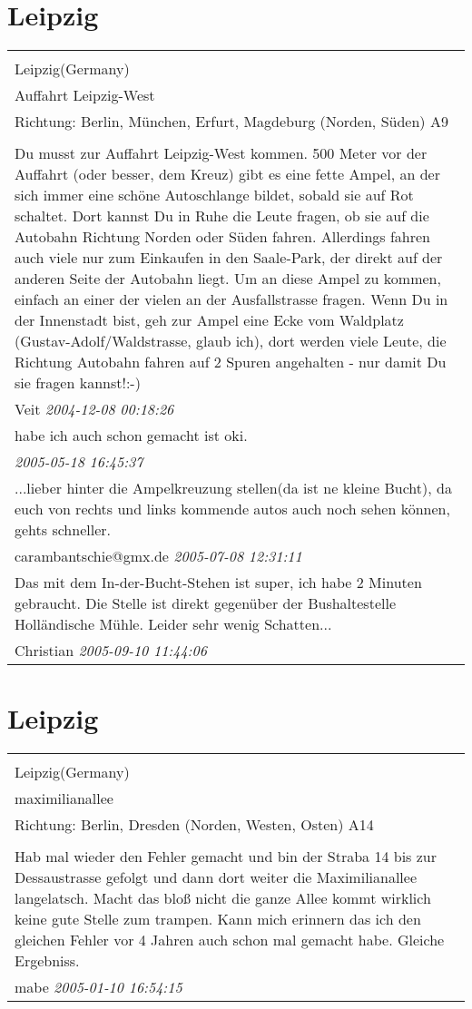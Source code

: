 \documentclass[a4paper,12pt]{article}
\begin{document}
\section{Leipzig}
\begin{tabular}{|p{13cm}|}
\hline\\
Leipzig(Germany)\\
Auffahrt Leipzig-West\\
Richtung: Berlin, München, Erfurt, Magdeburg (Norden, Süden) A9 \\
\hline\\
Du musst zur Auffahrt Leipzig-West kommen. 500 Meter vor der Auffahrt (oder besser, dem Kreuz) gibt es eine fette Ampel, an der sich immer eine schöne Autoschlange bildet, sobald sie auf Rot schaltet. Dort kannst Du in Ruhe die Leute fragen, ob sie auf die Autobahn Richtung Norden oder Süden fahren. Allerdings fahren auch viele nur zum Einkaufen in den Saale-Park, der direkt auf der anderen Seite der Autobahn liegt. Um an diese Ampel zu kommen, einfach an einer der vielen an der Ausfallstrasse fragen. Wenn Du in der Innenstadt bist, geh zur Ampel eine Ecke vom Waldplatz (Gustav-Adolf/Waldstrasse, glaub ich), dort werden viele Leute, die Richtung Autobahn fahren auf 2 Spuren angehalten - nur damit Du sie fragen kannst!:-) \\
Veit \textit{ 2004-12-08 00:18:26 }\\\hline habe ich auch schon gemacht ist oki. \\
\textit{ 2005-05-18 16:45:37 }\\\hline ...lieber hinter die Ampelkreuzung stellen(da ist ne kleine Bucht), da euch von rechts und links kommende autos auch noch sehen können, gehts schneller. \\
carambantschie@gmx.de \textit{ 2005-07-08 12:31:11 }\\\hline Das mit dem In-der-Bucht-Stehen ist super, ich habe 2 Minuten gebraucht. Die Stelle ist direkt gegenüber der Bushaltestelle Holländische Mühle. Leider sehr wenig Schatten... \\
Christian \textit{ 2005-09-10 11:44:06 }\\\hline
\end{tabular}


\section{Leipzig}
\begin{tabular}{|p{13cm}|}
\hline\\
Leipzig(Germany)\\
maximilianallee\\
Richtung: Berlin, Dresden (Norden, Westen, Osten) A14 \\
\hline\\
Hab mal wieder den Fehler gemacht und bin der Straba 14 bis zur Dessaustrasse gefolgt und dann dort weiter die Maximilianallee langelatsch. Macht das bloß nicht die ganze Allee kommt wirklich keine gute Stelle zum trampen. Kann mich erinnern das ich den gleichen Fehler vor 4 Jahren auch schon mal gemacht habe. Gleiche Ergebniss. \\
mabe \textit{ 2005-01-10 16:54:15 }\\\hline
\end{tabular}
\end{document}
